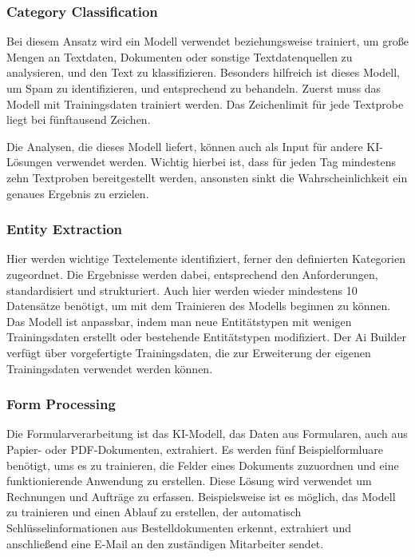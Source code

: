 \subsubsection{Category Classification}

Bei diesem Ansatz wird ein Modell verwendet beziehungsweise trainiert, um große Mengen an Textdaten, Dokumenten oder sonstige Textdatenquellen zu analysieren, und den Text zu klassifizieren. Besonders hilfreich ist dieses Modell, um Spam zu identifizieren, und entsprechend zu behandeln. Zuerst muss das Modell mit Trainingsdaten trainiert werden. Das Zeichenlimit für jede Textprobe liegt bei fünftausend Zeichen.

Die Analysen, die dieses Modell liefert, können auch als Input für andere KI-Lösungen verwendet werden. Wichtig hierbei ist, dass für jeden Tag mindestens zehn Textproben bereitgestellt werden, ansonsten sinkt die Wahrscheinlichkeit ein genaues Ergebnis zu erzielen.

\subsubsection{Entity Extraction}

Hier werden wichtige Textelemente identifiziert, ferner den definierten Kategorien zugeordnet. Die Ergebnisse werden dabei, entsprechend den Anforderungen, standardisiert und strukturiert. Auch hier werden wieder mindestens 10 Datensätze benötigt, um mit dem Trainieren des Modells beginnen zu können. Das Modell ist anpassbar, indem man neue Entitätstypen mit wenigen Trainingsdaten erstellt oder bestehende Entitätstypen modifiziert. Der Ai Builder verfügt über vorgefertigte Trainingsdaten, die zur Erweiterung der eigenen Trainingsdaten verwendet werden können.

\subsubsection{Form Processing}

Die Formularverarbeitung ist das KI-Modell, das Daten aus Formularen, auch aus Papier- oder PDF-Dokumenten, extrahiert. Es werden fünf Beispielformluare benötigt, ums es zu trainieren, die Felder eines Dokuments zuzuordnen und eine funktionierende Anwendung zu erstellen. Diese Lösung wird verwendet um Rechnungen und Aufträge zu erfassen. Beispielsweise ist es möglich, das Modell zu trainieren und einen Ablauf zu erstellen, der automatisch Schlüsselinformationen aus Bestelldokumenten erkennt, extrahiert und anschließend eine E-Mail an den zuständigen Mitarbeiter sendet.

